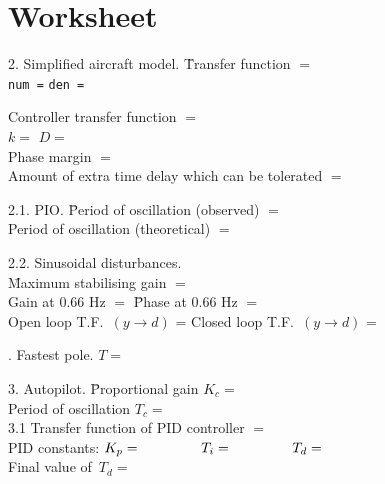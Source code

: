 \documentclass[fleqn,12pt,a4paper,twoside]{article}
\begin{document}
  
  \newpage
  \thispagestyle{empty}
\section*{Worksheet}

\begin{tabbing}
2. Simplified aircraft model. \= Transfer function $=$ \\[4mm]
        \verb+num =+ \>\verb+den =+\\[1mm]
\end{tabbing}

\noindent
Controller transfer function $=$\\[4mm]
$k=$ \hspace*{2cm} $D=$\\[3mm]

\noindent
Phase margin $=$\\[3mm]

\noindent
Amount of extra time delay which can be tolerated $=$\\[3mm] 

\begin{tabbing}
2.1. PIO. \= Period of oscillation (observed) $=$\\[4mm]
        \> Period of oscillation (theoretical) $=$\\[1mm]
\end{tabbing}

\begin{tabbing}
2.2. Sinusoidal disturbances.\\[4mm]
 \= Maximum stabilising gain $=$\\[4mm]
        \> Gain at 0.66 Hz $=$ \hspace*{4cm} \= Phase at 0.66 Hz $=$\\[4mm]
        \> Open loop T.F.\ $(y\to d)$ =   \> Closed loop T.F.\ $(y\to d)$ =\\[1mm]
\end{tabbing}

. Fastest pole. $T=$\\[3mm]

\begin{tabbing}
3. Autopilot. \= Proportional gain $K_c=$\\[4mm]
        \> Period of oscillation $T_c=$\\[4mm]
3.1 Transfer function of PID controller $=$\\[10mm]
    \> PID constants: $K_p = \hspace*{1.5cm} T_i = \hspace*{1.5cm}
T_d = \hspace*{1cm}$\\[4mm]
        \> Final value of \,$T_d = $\\
\end{tabbing}
\end{document}
